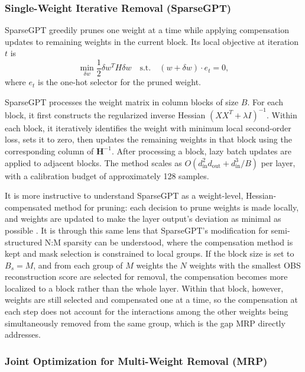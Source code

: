 \subsubsection{Single-Weight Iterative Removal (SparseGPT)}

SparseGPT \cite{frantar2023sparsegpt} greedily prunes one weight at a time while applying compensation updates to remaining weights in the current block. Its local objective at iteration $t$ is
\begin{equation}\label{eq:srp}
	\min_{\delta w} \frac{1}{2}\delta w^T H \delta w
	\quad\text{s.t.}\quad
	(w+\delta w)\cdot e_t = 0,
\end{equation}
where $e_t$ is the one-hot selector for the pruned weight.

SparseGPT processes the weight matrix in column blocks of size $B$. For each block, it first constructs the regularized inverse Hessian $(XX^T + \lambda I)^{-1}$. Within each block, it iteratively identifies the weight with minimum local second-order loss, sets it to zero, then updates the remaining weights in that block using the corresponding column of $\mathbf{H}^{-1}$. After processing a block, lazy batch updates are applied to adjacent blocks. The method scales as $O(d_{\text{in}}^2 d_{\text{out}} + d_{\text{in}}^3/B)$ per layer, with a calibration budget of approximately 128 samples.

It is more instructive to understand SparseGPT as a weight-level, Hessian-compensated method for pruning: each decision to prune weights is made locally, and weights are updated to make the layer output's deviation as minimal as possible \cite{frantar2023sparsegpt}. It is through this same lens that SparseGPT's modification for semi-structured N:M sparsity can be understood, where the compensation method is kept and mask selection is constrained to local groups. If the block size is set to $B_s = M$, and from each group of $M$ weights the $N$ weights with the smallest OBS reconstruction score are selected for removal, the compensation becomes more localized to a block rather than the whole layer. Within that block, however, weights are still selected and compensated one at a time, so the compensation at each step does not account for the interactions among the other weights being simultaneously removed from the same group, which is the gap MRP directly addresses.

\methodsep

\subsubsection{Joint Optimization for Multi-Weight Removal (MRP)}

